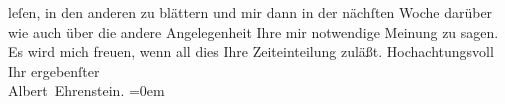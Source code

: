 \begin{ledgroupsized}[t]{13cm}
                    leſen, in den anderen zu blättern und mir dann in der nächſten Woche darüber wie
                    auch über die andere Angelegenheit Ihre mir notwendige Meinung zu sagen. Es wird
                    mich freuen, wenn all dies Ihre Zeiteinteilung zuläßt.\pend
           \pstart
           Hochachtungsvoll{\\[\baselineskip]}Ihr ergebenſter{\\[\baselineskip]}\spacefill\mbox{Albert Ehrenstein.}\pend
           \leftskip=0em{}\endnumbering{}\end{ledgroupsized}  \newcommand{\dateiname}{L01889}\newcommand{\titel}{Albert Ehrenstein an Arthur Schnitzler, 25. 11. 1909}\newcommand{\editorInnen}{Martin Anton Müller und Gerd-Hermann Susen}
      